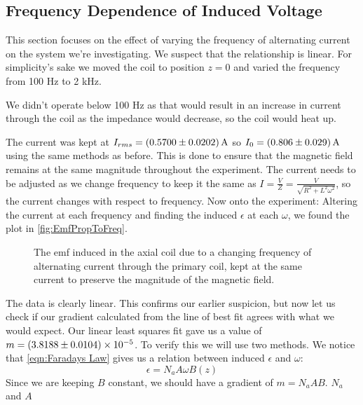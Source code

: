 \documentclass[12pt]{article}
\numberwithin{equation}{section}
\numberwithin{figure}{section}
\numberwithin{table}{section}
\begin{document}
    \subsection{Frequency Dependence of Induced Voltage}
    This section focuses on the effect of varying the frequency of alternating current on the 
    system we're investigating. We suspect that the relationship is linear.
    For simplicity's sake we moved the coil to position $z=0$ and varied the frequency from 
    100 Hz to 2 kHz. 
    
    We didn't operate below 100 Hz as that would 
    result in an increase in current through the coil as the impedance would decrease, so the 
    coil would heat up.

    The current was kept at $I_{rms}=\SI{0.57\pm0.0202}{\ampere}$ so $I_0=\SI{0.806\pm0.029}{\ampere}$ 
    using the same methods as before. This is done to ensure that the magnetic field remains at 
    the same magnitude throughout the experiment. The current needs to be adjusted as we change 
    frequency to keep it the same as $I=\frac{V}{Z}=\frac{V}{\sqrt{R^2+L^2\omega^2}}$, so the 
    current changes with respect to frequency. \newline
    Now onto the experiment: Altering the current at each frequency and finding the induced 
    $\epsilon$ at each $\omega$, we found the plot in \autoref{fig:EmfPropToFreq}. 
    \begin{figure}[H]
        \begin{center}
           \caption{The emf induced in the axial coil due to a changing frequency of alternating 
           current through the primary coil, kept at the same current to preserve the magnitude 
           of the magnetic field.}
           \label{fig:EmfPropToFreq}
        \end{center}
    \end{figure}
    The data is clearly linear. This confirms our earlier suspicion, but now let us check if 
    our gradient calculated from the line of best fit agrees with what we would expect. Our 
    linear least squares fit gave us a value of $m=\num{3.8188\pm0.0104e-05}$. To verify this 
    we will use two methods. We notice that \autoref{eqn:Faradays Law} gives us a relation 
    between induced $\epsilon$ and $\omega$:
    \begin{equation}
        \epsilon=N_aA\omega B(z)
    \end{equation}
    Since we are keeping $B$ constant, we should have a gradient of $m=N_aAB$. $N_a$ and $A$ 
\end{document}
